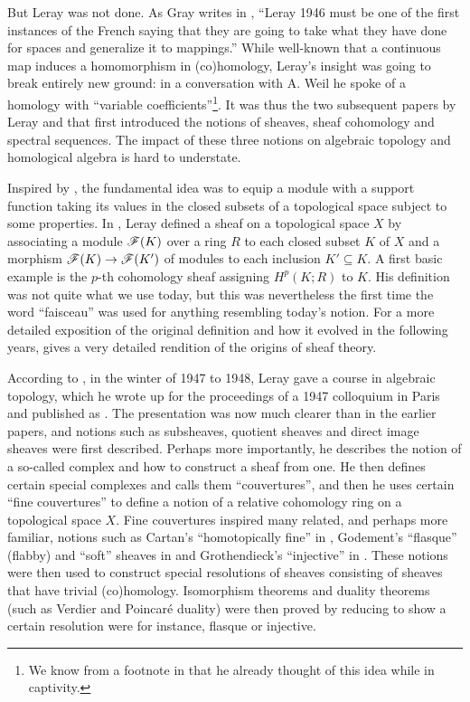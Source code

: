 \documentclass[../../thesis.tex]{subfiles}
\begin{document}
But Leray was not done.
As Gray writes in \cite{Gray}, ``Leray 1946 must be one of the first instances of the French saying that they are going to take what they have done for spaces and generalize it to mappings.''
While well-known that a continuous map induces a homomorphism in (co)homology, Leray's insight was going to break entirely new ground: in a conversation with A. Weil \cite{BorelAMS} he spoke of a homology with ``variable coefficients''\footnote{We know from a footnote in \cite{Leray45c2} that he already thought of this idea while in captivity.}.
It was thus the two subsequent papers by Leray \cite{Leray46a} and \cite{Leray46b} that first introduced the notions of sheaves, sheaf cohomology and spectral sequences.
The impact of these three notions on algebraic topology and homological algebra is hard to understate.


Inspired by \cite{Alexander}, the fundamental idea was to equip a module with a support function taking its values in the closed subsets of a topological space subject to some properties.
In \cite{Leray46a}, Leray defined a sheaf on a topological space $X$ by associating a module $\mathscr{F}(K)$ over a ring $R$ to each closed subset $K$ of $X$ and a morphism $\mathscr{F}(K) \to \mathscr{F}(K')$ of modules to each inclusion $K' \subseteq K$.
A first basic example is the $p$-th cohomology sheaf assigning $H^p(K ; R)$ to $K$.
His definition was not quite what we use today, but this was nevertheless the first time the word ``faisceau'' was used for anything resembling today's notion.
For a more detailed exposition of the original definition and how it evolved in the following years, \cite{Gray} gives a very detailed rendition of the origins of sheaf theory.


According to \cite{Gray}, in the winter of 1947 to 1948, Leray gave a course in algebraic topology, which he wrote up for the proceedings of a 1947 colloquium in Paris and published as \cite{Leray49}.
The presentation was now much clearer than in the earlier papers, and notions such as subsheaves, quotient sheaves and direct image sheaves were first described.
Perhaps more importantly, he describes the notion of a so-called complex and how to construct a sheaf from one.
He then defines certain special complexes and calls them ``couvertures'', and then he uses certain ``fine couvertures'' to define a notion of a relative cohomology ring on a topological space $X$.
Fine couvertures inspired many related, and perhaps more familiar, notions such as Cartan's ``homotopically fine'' in \cite{Cartan_50_4}, Godement's ``flasque'' (flabby) and ``soft'' sheaves in \cite{Godement58} and Grothendieck's ``injective'' in \cite{Tohoku}.
These notions were then used to construct special resolutions of sheaves consisting of sheaves that have trivial (co)homology.
Isomorphism theorems and duality theorems (such as Verdier and Poincaré duality) were then proved by reducing to show a certain resolution were for instance, flasque or injective.
\end{document}
